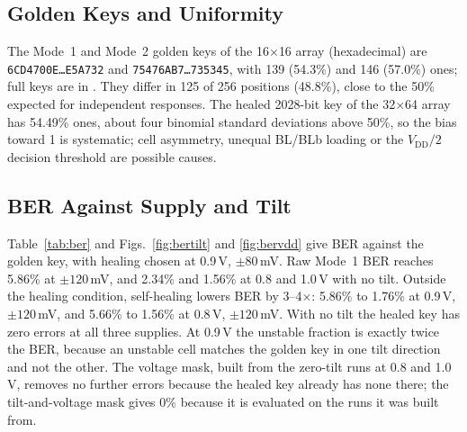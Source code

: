 \documentclass[journal]{IEEEtran}
\newcommand{\VDD}{V_{\mathrm{DD}}}
\begin{document}
\subsection{Golden Keys and Uniformity}
The Mode~1 and Mode~2 golden keys of the 16$\times$16 array (hexadecimal) are \texttt{6CD4700E\ldots E5A732} and \texttt{75476AB7\ldots 735345}, with 139 (54.3\%) and 146 (57.0\%) ones; full keys are in . They differ in 125 of 256 positions (48.8\%), close to the 50\% expected for independent responses. The healed 2028-bit key of the 32$\times$64 array has 54.49\% ones, about four binomial standard deviations above 50\%, so the bias toward 1 is systematic; cell asymmetry, unequal BL/BLb loading or the $\VDD/2$ decision threshold are possible causes.

\subsection{BER Against Supply and Tilt}
Table~\ref{tab:ber} and Figs.~\ref{fig:bertilt} and \ref{fig:bervdd} give BER against the golden key, with healing chosen at 0.9\,V, $\pm80$\,mV. Raw Mode~1 BER reaches 5.86\% at $\pm120$\,mV, and 2.34\% and 1.56\% at 0.8 and 1.0\,V with no tilt. Outside the healing condition, self-healing lowers BER by 3--4$\times$: 5.86\% to 1.76\% at 0.9\,V, $\pm120$\,mV, and 5.66\% to 1.56\% at 0.8\,V, $\pm120$\,mV. With no tilt the healed key has zero errors at all three supplies. At 0.9\,V the unstable fraction is exactly twice the BER, because an unstable cell matches the golden key in one tilt direction and not the other. The voltage mask, built from the zero-tilt runs at 0.8 and 1.0\,V, removes no further errors because the healed key already has none there; the tilt-and-voltage mask gives 0\% because it is evaluated on the runs it was built from.
\end{document}
